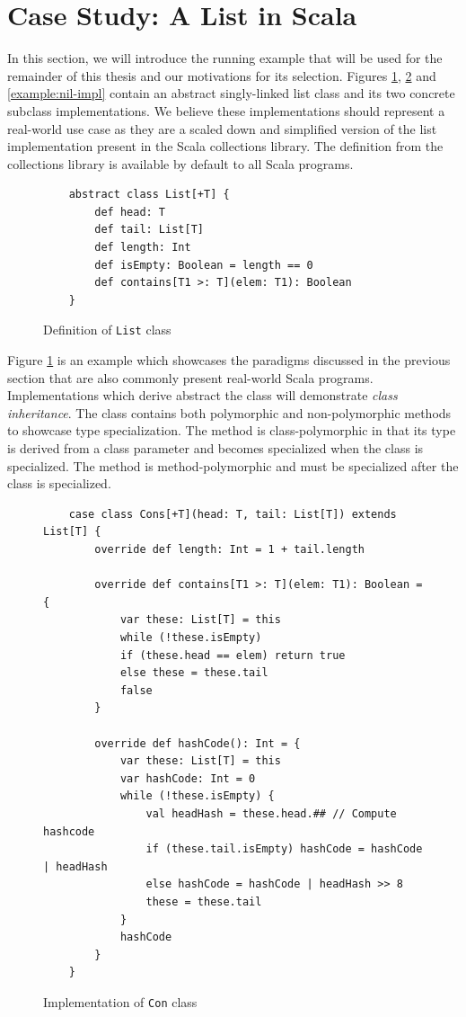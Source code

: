 \section{Case Study: A List in Scala}

In this section, we will introduce the running example that will be used for the remainder of this thesis and our motivations for its selection.
Figures \ref{example:list-def}, \ref{example:cons-impl} and \ref{example:nil-impl} contain an abstract singly-linked list class and its two concrete subclass implementations. 
We believe these  implementations should represent a real-world use case as they are a scaled down and simplified version of the list implementation present in the Scala collections library.
The  definition from the collections library is available by default to all Scala programs.

\begin{figure}[!htb]
	\begin{verbatim}
	abstract class List[+T] {
		def head: T
		def tail: List[T]
		def length: Int
		def isEmpty: Boolean = length == 0
		def contains[T1 >: T](elem: T1): Boolean
	}
	\end{verbatim}
	\caption{Definition of \texttt{List} class}
	\label{example:list-def}
\end{figure}

Figure \ref{example:list-def} is an example which showcases the paradigms discussed in the previous section that are also commonly present real-world Scala programs.
Implementations which derive abstract the  class will demonstrate \textit{class inheritance}.
The  class contains both polymorphic and non-polymorphic methods to showcase type specialization.
The  method is class-polymorphic in that its type is derived from a class parameter and becomes specialized when the class is specialized.
The  method is method-polymorphic and must be specialized after the class is specialized.

\begin{figure}[!htb]
	\begin{verbatim}
	case class Cons[+T](head: T, tail: List[T]) extends List[T] {
		override def length: Int = 1 + tail.length
		
		override def contains[T1 >: T](elem: T1): Boolean = {
			var these: List[T] = this
			while (!these.isEmpty) 
			if (these.head == elem) return true
			else these = these.tail
			false
		}
			
		override def hashCode(): Int = {
			var these: List[T] = this
			var hashCode: Int = 0
			while (!these.isEmpty) {
				val headHash = these.head.## // Compute hashcode
				if (these.tail.isEmpty) hashCode = hashCode | headHash
				else hashCode = hashCode | headHash >> 8
				these = these.tail
			}
			hashCode
		}
	}
	\end{verbatim}
	\caption{Implementation of \texttt{Con} class}
	\label{example:cons-impl}
\end{figure}

